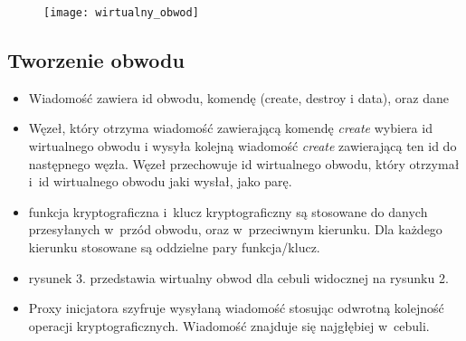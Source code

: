         \begin{figure}
            \texttt{[image: wirtualny\_obwod]}
        \end{figure}
        \subsection{Tworzenie obwodu}
        \begin{itemize}
            \item Wiadomość zawiera id obwodu, komendę (create, destroy i data), oraz dane
            \item Węzeł, który otrzyma wiadomość zawierającą komendę \textit{create} wybiera id wirtualnego obwodu i wysyła kolejną wiadomość \textit{create} zawierającą ten id do następnego węzła. Węzeł przechowuje id wirtualnego obwodu, który otrzymał i~id wirtualnego obwodu jaki wysłał, jako parę.
            \item funkcja kryptograficzna i~klucz kryptograficzny są stosowane do danych przesyłanych w~przód obwodu, oraz w~przeciwnym kierunku. Dla każdego kierunku stosowane są oddzielne pary funkcja/klucz.
            \item rysunek 3. przedstawia wirtualny obwod dla cebuli widocznej na rysunku 2.
            \item Proxy inicjatora szyfruje wysyłaną wiadomość stosując odwrotną kolejność operacji kryptograficznych. Wiadomość znajduje się najgłębiej w~cebuli.
        \end{itemize}
